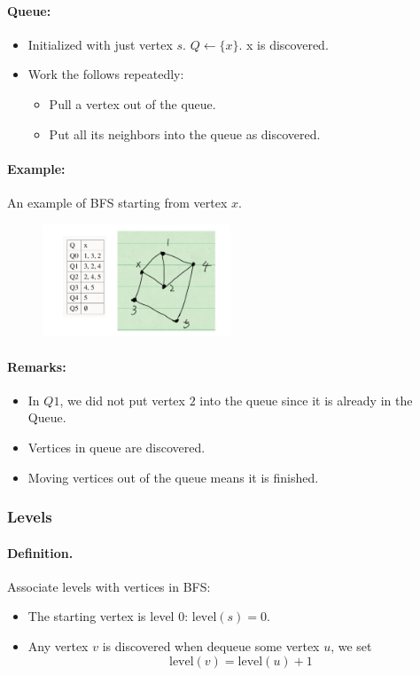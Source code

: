 \documentclass[en,hazy,blue,screen,14pt]{elegantnote}
\begin{document}
\paragraph{Queue:}
\begin{itemize}
 \item Initialized with just vertex $s$. $Q \leftarrow \{x\}$. x is discovered.
 \item Work the follows repeatedly:
 \begin{itemize}
  \item Pull a vertex out of the queue.
  \item Put all its neighbors into the queue as discovered.
 \end{itemize}
\end{itemize}

\paragraph{Example:}
An example of BFS starting from vertex $x$.
\begin{figure}[H]
\centering
\includegraphics[width=0.5\textwidth]{queue.png}
\end{figure}

\paragraph{Remarks:}
\begin{itemize}
 \item In $Q1$, we did not put vertex $2$ into the queue since it is already in 
the Queue.
\item Vertices in queue are discovered.
\item Moving vertices out of the queue means it is finished.
\end{itemize}
\subsubsection{Levels}
\paragraph{Definition.}
Associate levels with vertices in BFS: 
\begin{itemize}
 \item The starting vertex is level 0: $\text{level}(s) = 0$.
 \item Any vertex $v$ is discovered when dequeue some vertex $u$, we set
\[\text{level}(v) = \text{level}(u) + 1\]
\end{itemize}
\end{document}
